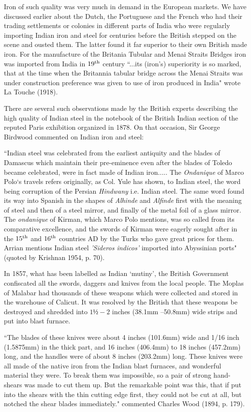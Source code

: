 Iron of such quality was very much in demand in the European markets.  We have discussed earlier about the Dutch, the Portuguese and the French who had their trading settlements or colonies in different parts of India who were regularly importing Indian iron and steel for centuries before the British stepped on the scene and ousted them.  The latter found it far superior to their own British made iron.  For the manufacture of the Britania Tubular and Menai Straits Bridges iron was imported from India in $19^{\rm th}$ century ``...its (iron's) superiority is so marked, that at the time when the Britannia tabular bridge across the Menai Straits was under construction preference was given to use of iron produced in India" wrote La Touche (1918).

There are several such observations made by the British experts describing the high quality of Indian steel in the notebook of the British Indian section of the reputed Paris exhibition organized in 1878. On that occasion, Sir George Birdwood commented on Indian iron and steel:

\footnotesize{``Indian steel was celebrated from the earliest antiquity and the blades of Damascus which maintain their pre-eminence even after the blades of Toledo became celebrated, were in fact made of Indian iron..... The {\it Ondanique} of Marco Polo`s travels refers originally, as Col. Yule has shown, to Indian steel, the word being corruption of the Persian {\it Hindwany} i.e. Indian steel.  The same word found its way into Spanish in the shapes of {\it Alhinde} and {\it Alfinde} first with the meaning of steel and then of a steel mirror, and finally of the metal foil of a glass mirror.  The {\it ondanique} of Kirman, which Marco Polo mentions, was so called from its comparative excellence, and the swords of Kirman were eagerly sought after in the $15^{\rm th}$ and $16^{\rm th}$ countries AD by the Turks who gave great prices for them.  Arrian mentions Indian steel {\it 'Sideros indicos'} imported into Abyssinian ports"} (quoted by Krishnan 1954, p. 70).

In 1857, what has been labelled as Indian `mutiny', the British Government confiscated all the swords, daggers and knives from the local people.  The Moplas of Malabar had thousands of these weapons which were collected and stored in the warehouse of Calicut. It was resolved by the British that these weapons be destroyed and shredded into $1½ - 2$ inches (38.1mm –50.8mm) wide strips and put into blast furnace. 

\footnotesize{``The blades of these knives were about 4 inches (101.6mm) wide and 1/16 inch (1.5875mm) in the thick part, and 16 inches (406.4mm) to 18 inches (457.2mm) long, and the handles were of about 8 inches (203.2mm) long.  These knives were all made of the native iron from the Indian blast furnaces, and wonderful material they were.  To break them was impossible, so a pair of strong hand-shears was made to cut them up.  But the remarkable point was this, that if put into the shears with the thin cutting edge first, they could not be cut at all, but notched the shear blades immediately."} commented Charles Wood (1894, p. 179).  

